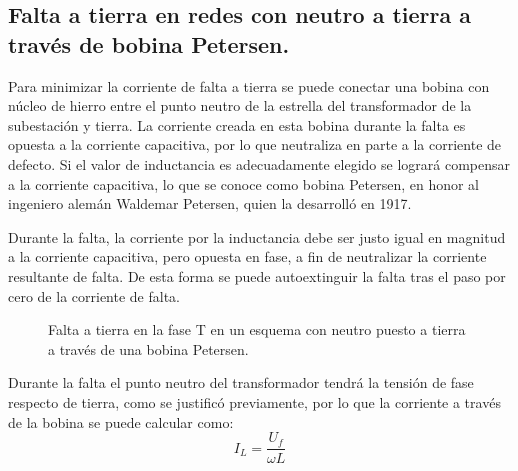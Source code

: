         \subsection{Falta a tierra en redes con neutro a tierra a través de bobina Petersen.}
            Para minimizar la corriente de falta a tierra se puede conectar una bobina con núcleo de hierro entre el punto neutro de la estrella del transformador de la subestación y tierra. La corriente creada en esta bobina durante la falta es opuesta a la corriente capacitiva, por lo que neutraliza en parte a la corriente de defecto. Si el valor de inductancia es adecuadamente elegido se logrará compensar a la corriente capacitiva, lo que se conoce como bobina Petersen, en honor al ingeniero alemán Waldemar Petersen, quien la desarrolló en 1917.\newline

            Durante la falta, la corriente por la inductancia debe ser justo igual en magnitud a la corriente capacitiva, pero opuesta en fase, a fin de neutralizar la corriente resultante de falta. De esta forma se puede autoextinguir la falta tras el paso por cero de la corriente de falta.

            \begin{figure}[H]
                \centering
                \caption{Falta a tierra en la fase T en un esquema con neutro puesto a tierra a través de una bobina Petersen.}
            \end{figure}

            Durante la falta el punto neutro del transformador tendrá la tensión de fase respecto de tierra, como se justificó previamente, por lo que la corriente a través de la bobina se puede calcular como:
            \begin{equation}
                I_\textit{L} = \dfrac{U_\textit{f}}{\omega L}
            \end{equation}

